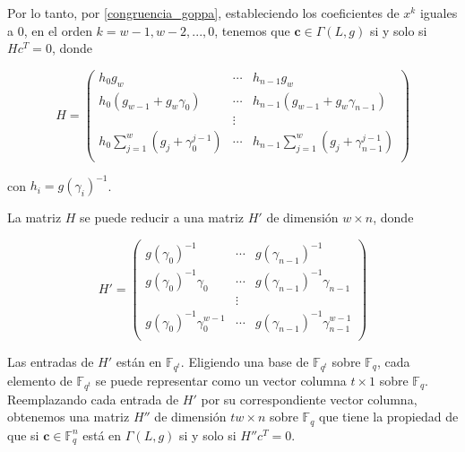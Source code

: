 Por lo tanto, por \eqref{congruencia_goppa}, estableciendo los coeficientes de $x^k$ iguales a $0$, en el orden $k = w - 1, w - 2, ..., 0$, tenemos que $\textbf{c} \in \Gamma(L,g)$ si y solo si $Hc^T = 0$, donde 

\begin{equation}
    H = \left(
        \begin{array}{ccc} 
            h_0 g_w & \cdots & h_{n-1} g_w  \\
            h_0 (g_{w-1} + g_w \gamma_0) & \cdots & h_{n-1} (g_{w-1} + g_w \gamma_{n-1}) \\
            & \vdots & \\
            h_0 \sum_{j=1}^w \left( g_j + \gamma_0^{j-1} \right) & \cdots & h_{n-1} \sum_{j=1}^w \left( g_{j} + \gamma_{n-1}^{j-1} \right) \\
        \end{array}
        \right)
\end{equation}

con $h_i = g(\gamma_i)^{-1}$.

\begin{proposition}
    La matriz $H$ se puede reducir a una matriz $H'$ de dimensión $w \times n$, donde 

    \begin{equation}
        H' = \left(
            \begin{array}{ccc} 
                g(\gamma_0)^{-1} & \cdots & g(\gamma_{n-1})^{-1}  \\
                g(\gamma_0)^{-1} \gamma_0 & \cdots & g(\gamma_{n-1})^{-1} \gamma_{n-1} \\
                & \vdots & \\
                g(\gamma_0)^{-1} \gamma_0^{w-1} & \cdots & g(\gamma_{n-1})^{-1} \gamma_{n-1}^{w-1} \\
            \end{array}
            \right)
    \end{equation}
\end{proposition}

Las entradas de $H'$ están en $\mathbb{F}_{q^t}$. Eligiendo una base de $\mathbb{F}_{q^t}$ sobre $\mathbb{F}_q$, cada elemento de $\mathbb{F}_{q^t}$ se puede representar como un vector columna $t \times 1$ sobre $\mathbb{F}_q$. Reemplazando cada entrada de $H'$ por su correspondiente vector columna, obtenemos una matriz $H''$ de dimensión $tw \times n$ sobre $\mathbb{F}_{q}$ que tiene la propiedad de que si $\textbf{c} \in \mathbb{F}_q^n$ está en $\Gamma(L,g)$ si y solo si $H''c^T = 0$.

